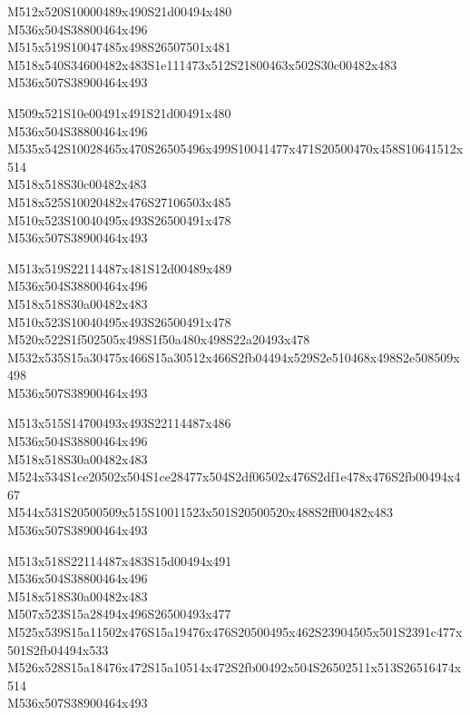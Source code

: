 \documentclass{article}
\begin{document}
\begin{multicols}{5}
\begin{center}
M512x520S10000489x490S21d00494x480 %
\\M536x504S38800464x496 %
\\M515x519S10047485x498S26507501x481 %
\\M518x540S34600482x483S1e111473x512S21800463x502S30c00482x483 %
\\M536x507S38900464x493 %
\vfil
\columnbreak

M509x521S10e00491x491S21d00491x480 %
\\M536x504S38800464x496 %
\\M535x542S10028465x470S26505496x499S10041477x471S20500470x458S10641512x514 %
\\M518x518S30c00482x483 %
\\M518x525S10020482x476S27106503x485 %
\\M510x523S10040495x493S26500491x478 %
\\M536x507S38900464x493 %
\vfil
\columnbreak

M513x519S22114487x481S12d00489x489 %
\\M536x504S38800464x496 %
\\M518x518S30a00482x483 %
\\M510x523S10040495x493S26500491x478 %
\\M520x522S1f502505x498S1f50a480x498S22a20493x478 %
\\M532x535S15a30475x466S15a30512x466S2fb04494x529S2e510468x498S2e508509x498 %
\\M536x507S38900464x493 %
\vfil
\columnbreak

M513x515S14700493x493S22114487x486 %
\\M536x504S38800464x496 %
\\M518x518S30a00482x483 %
\\M524x534S1ce20502x504S1ce28477x504S2df06502x476S2df1e478x476S2fb00494x467 %
\\M544x531S20500509x515S10011523x501S20500520x488S2ff00482x483 %
\\M536x507S38900464x493 %
\vfil
\columnbreak

M513x518S22114487x483S15d00494x491 %
\\M536x504S38800464x496 %
\\M518x518S30a00482x483 %
\\M507x523S15a28494x496S26500493x477 %
\\M525x539S15a11502x476S15a19476x476S20500495x462S23904505x501S2391c477x501S2fb04494x533 %
\\M526x528S15a18476x472S15a10514x472S2fb00492x504S26502511x513S26516474x514 %
\\M536x507S38900464x493 %
\vfil

\end{center}
\end{multicols}
\end{document}
